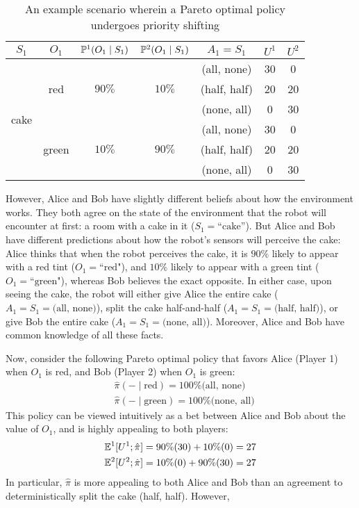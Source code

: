\documentclass{article}
\begin{document}
\begin{table*}[t]
\centering
\begin{tabular}{*{7}{|c}|}
\hline
$S_1$ & $O_1$& $\mathbb{P}^1(O_1\mid S_1)$ & $\mathbb{P}^2(O_1\mid S_1)$ & $A_1=S_1$ & $U^1$ & $U^2$ \\ \hline
{}
& 
& 
& 
& (all, none) & 30 & 0 \\ 
&&&& (half, half) & 20 & 20 \\ 
&&&& (none, all) & 0 & 30 \\ 
& 
& 
& 
& (all, none) & 30 & 0 \\ 
&&&& (half, half) & 20 & 20 \\ 
&&&& (none, all) & 0 & 30 \\ 
\hline
\end{tabular}
\caption{An example scenario wherein a Pareto optimal policy undergoes priority shifting}
\label{table:scenario}
\end{table*}

However, Alice and Bob have slightly different beliefs about how the environment works.  They both agree on the state of the environment that the robot will encounter at first: a room with a cake in it ($S_1=\text{``cake''}$).  But Alice and Bob have different predictions about how the robot's sensors will perceive the cake: Alice thinks that when the robot perceives the cake, it is $90\%$ likely to appear with a red tint ($O_1=\text{``red"}$), and $10\%$ likely to appear with a green tint ($O_1=\text{``green"}$), whereas Bob believes the exact opposite.  In either case, upon seeing the cake, the robot will either give Alice the entire cake ($A_1=S_1=\text{(all, none)}$), split the cake half-and-half ($A_1=S_1=\text{(half, half)}$), or give Bob the entire cake ($A_1=S_1=\text{(none, all)}$).  Moreover, Alice and Bob have common knowledge of all these facts.

Now, consider the following Pareto optimal policy that favors Alice (Player 1) when $O_1$ is red, and Bob (Player 2) when $O_1$ is green:
%
\begin{align*}
&\hat\pi(- \mid \text{red}) = 100\%\text{(all, none)}\\
&\hat\pi(- \mid \text{green}) = 100\%\text{(none, all)}
\end{align*}
%
This policy can be viewed intuitively as a bet between Alice and Bob about the value of $O_1$, and is highly appealing to both players:
%
\begin{align*}
\mathbb{E}^1[U^1; \hat\pi] &= 90\%(30) + 10\%(0) = 27\\
\mathbb{E}^2[U^2; \hat\pi] &= 10\%(0) + 90\%(30) = 27
\end{align*}
In particular, $\hat\pi$ is more appealing to both Alice and Bob than an agreement to deterministically split the cake (half, half).  However, 
\end{document}
